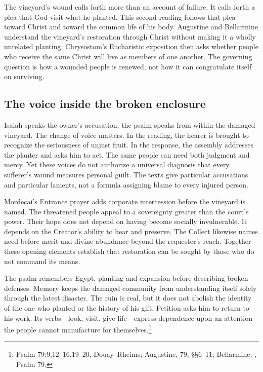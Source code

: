 The vineyard's wound calls forth more than an account of failure. It calls forth a plea that God visit what he planted. This second reading follows that plea toward Christ and toward the common life of his body. Augustine and Bellarmine understand the vineyard's restoration through Christ without making it a wholly unrelated planting. Chrysostom's Eucharistic exposition then asks whether people who receive the same Christ will live as members of one another. The governing question is how a wounded people is renewed, not how it can congratulate itself on surviving.

\subsection{The voice inside the broken enclosure}
Isaiah speaks the owner's accusation; the psalm speaks from within the damaged vineyard. The change of voice matters. In the reading, the hearer is brought to recognize the seriousness of unjust fruit. In the response, the assembly addresses the planter and asks him to act. The same people can need both judgment and mercy. Yet these voices do not authorize a universal diagnosis that every sufferer's wound measures personal guilt. The texts give particular accusations and particular laments, not a formula assigning blame to every injured person.

Mordecai's Entrance prayer adds corporate intercession before the vineyard is named. The threatened people appeal to a sovereignty greater than the court's power. Their hope does not depend on having become socially invulnerable. It depends on the Creator's ability to hear and preserve. The Collect likewise names need before merit and divine abundance beyond the requester's reach. Together these opening elements establish that restoration can be sought by those who do not command its means.

The psalm remembers Egypt, planting and expansion before describing broken defenses. Memory keeps the damaged community from understanding itself solely through the latest disaster. The ruin is real, but it does not abolish the identity of the one who planted or the history of his gift. Petition asks him to return to his work. Its verbs---look, visit, give life---express dependence upon an attention the people cannot manufacture for themselves.\footnote{Psalm 79:9,12--16,19--20, Douay--Rheims; Augustine,  79, §§6--11; Bellarmine, , Psalm 79.}

